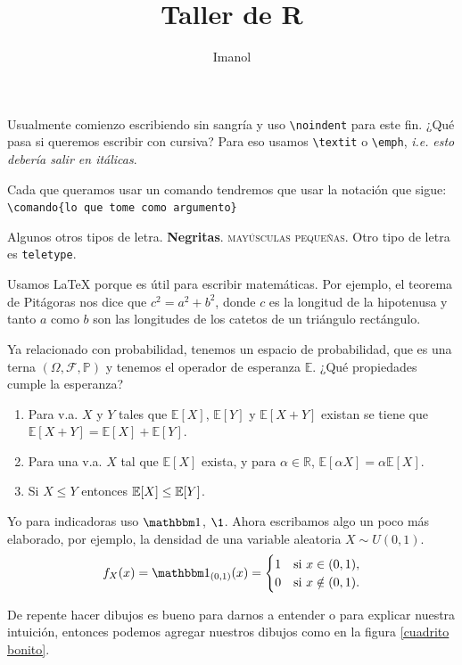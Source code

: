 \documentclass[11pt,article]{memoir} %
\title{Taller de R}
\author{Imanol}
\date{}
\newcommand{\edproba}{(\Omega, \mathscr F, \mathbb P)}
\begin{document}

\maketitle

\noindent Usualmente comienzo escribiendo sin sangría y uso \verb+\noindent+ para este fin. ¿Qué pasa si queremos escribir con cursiva? Para eso usamos \verb+\textit+ o \verb|\emph|, \textit{i.e.} \emph{esto debería salir en itálicas}.

Cada que queramos usar un comando tendremos que usar la notación que sigue: \verb|\comando{lo que tome como argumento}|

Algunos otros tipos de letra. \textbf{Negritas}. \textsc{mayúsculas pequeñas}. Otro tipo de letra es \texttt{teletype}.

Usamos \LaTeX{} porque es útil para escribir matemáticas. Por ejemplo, el teorema de Pitágoras nos dice que $ c^2 = a^2 + b^2 $, donde $c$ es la longitud de la hipotenusa y tanto $a$ como $b$ son las longitudes de los catetos de un triángulo rect\'angulo. 

Ya relacionado con probabilidad, tenemos un espacio de probabilidad, que es una terna $\edproba$ y tenemos el operador de esperanza $\mathbb E$. ¿Qué propiedades cumple la esperanza?

\begin{enumerate}
    \item Para v.a. $X$ y $Y$ tales que $\mathbb E[X]$, $\mathbb E[Y]$ y $\mathbb E[X+Y]$ existan se tiene que $\mathbb E [X+ Y] = \mathbb E [X] + \mathbb E[Y]$.
    \item Para una v.a. $X$ tal que $\mathbb E[X]$ exista, y para $\alpha \in \mathbb R$, $\mathbb E[\alpha X] = \alpha \mathbb E[X]$.
    \item Si $X \leq Y$ entonces $\mathbb{E}[X] \leq \mathbb{E}[Y]$.
\end{enumerate}

Yo para indicadoras uso $\mathbbm 1$, $\1$. Ahora escribamos algo un poco más elaborado, por ejemplo, la densidad de una variable aleatoria $X \sim U(0,1)$.
\[
f_X (x) = \mathbbm 1_{(0,1)}(x) = \begin{cases}
    1 & \text{si } x \in (0,1), \\
    0 & \text{si } x \notin (0,1).
\end{cases}
\]

De repente hacer dibujos es bueno para darnos a entender o para explicar nuestra intuición, entonces podemos agregar nuestros dibujos como en la figura \ref{cuadrito bonito}.
\end{document}
